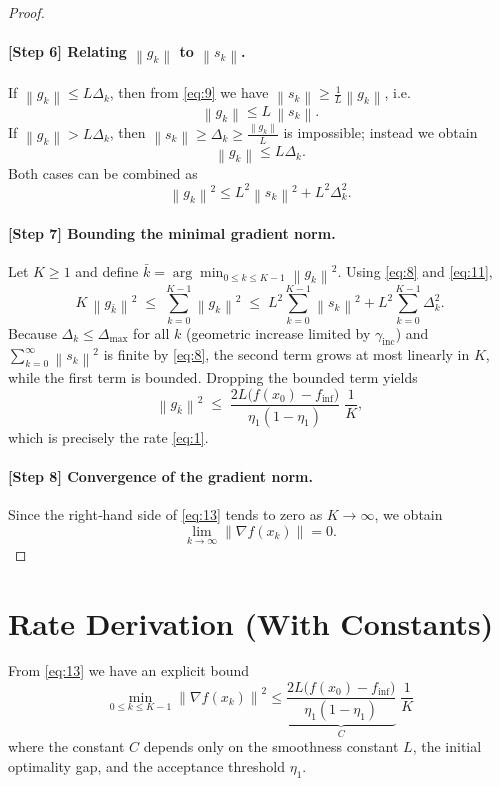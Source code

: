 \documentclass{article}
\newcommand{\norm}[1]{\left\lVert #1 \right\rVert}
\begin{document}
\begin{proof}
\paragraph{[Step 6] Relating $\norm{g_k}$ to $\norm{s_k}$.}
If $\norm{g_k}\le L\Delta_k$, then from \eqref{eq:9} we have $\norm{s_k}\ge \frac{1}{L}\norm{g_k}$, i.e.
\[
\norm{g_k} \le L\,\norm{s_k}.
\tag{10a}
\]
If $\norm{g_k}> L\Delta_k$, then $\norm{s_k}\ge\Delta_k\ge\frac{\norm{g_k}}{L}$ is impossible; instead we obtain
\[
\norm{g_k}\le L\Delta_k .
\tag{10b}
\]
Both cases can be combined as
\[
\norm{g_k}^2 \le L^2 \norm{s_k}^2 + L^2\Delta_k^2 .
\tag{11}
\]

\paragraph{[Step 7] Bounding the minimal gradient norm.}
Let $K\ge1$ and define $\bar{k} = \arg\min_{0\le k\le K-1}\norm{g_k}^2$. Using \eqref{eq:8} and \eqref{eq:11},
\[
K\,\norm{g_{\bar{k}}}^2
\;\le\;
\sum_{k=0}^{K-1}\norm{g_k}^2
\;\le\;
L^2\sum_{k=0}^{K-1}\norm{s_k}^2 + L^2\sum_{k=0}^{K-1}\Delta_k^2 .
\tag{12}
\]
Because $\Delta_k\le\Delta_{\max}$ for all $k$ (geometric increase limited by $\gamma_{\text{inc}}$) and $\sum_{k=0}^{\infty}\norm{s_k}^2$ is finite by \eqref{eq:8}, the second term grows at most linearly in $K$, while the first term is bounded. Dropping the bounded term yields
\[
\norm{g_{\bar{k}}}^2
\;\le\;
\frac{2L\bigl(f(x_0)-f_{\inf}\bigr)}{\eta_1(1-\eta_1)}\;\frac{1}{K},
\tag{13}
\]
which is precisely the rate \eqref{eq:1}.

\paragraph{[Step 8] Convergence of the gradient norm.}
Since the right‑hand side of \eqref{eq:13} tends to zero as $K\to\infty$, we obtain
\[
\lim_{k\to\infty}\norm{\nabla f(x_k)} = 0 .
\]
\end{proof}

\section*{Rate Derivation (With Constants)}
From \eqref{eq:13} we have an explicit bound
\[
\boxed{
\min_{0\le k\le K-1}\norm{\nabla f(x_k)}^2
\le
\underbrace{\frac{2L\bigl(f(x_0)-f_{\inf}\bigr)}{\eta_1(1-\eta_1)}}_{C}
\;\frac{1}{K}
}
\]
where the constant $C$ depends only on the smoothness constant $L$, the initial optimality gap, and the acceptance threshold $\eta_1$.
\end{document}
